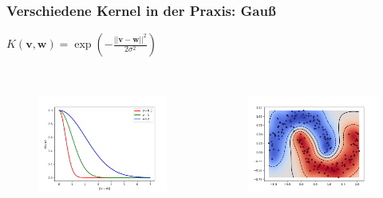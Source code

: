 	\begin{frame}
		\frametitle{Verschiedene Kernel in der Praxis: Gauß}
			\vspace{10pt}
			$K(\boldsymbol{v}, \boldsymbol{w}) = \exp\left(-\frac{\lvert\lvert\boldsymbol{v} - \boldsymbol{w}\rvert\rvert^{2}}{2\sigma^{2}}\right)$ \\\
			
			\begin{columns}
				\begin{column}{.5\textwidth}
					\begin{figure}
						\includegraphics[width=\textwidth]{img/sigmaGau.png}
					\end{figure}
				\end{column}
				\begin{column}{.5\textwidth}
					\begin{figure}
						\includegraphics[width=\textwidth]{img/kernelGau.png}
					\end{figure}
				\end{column}
			\end{columns}
	\end{frame}
	
